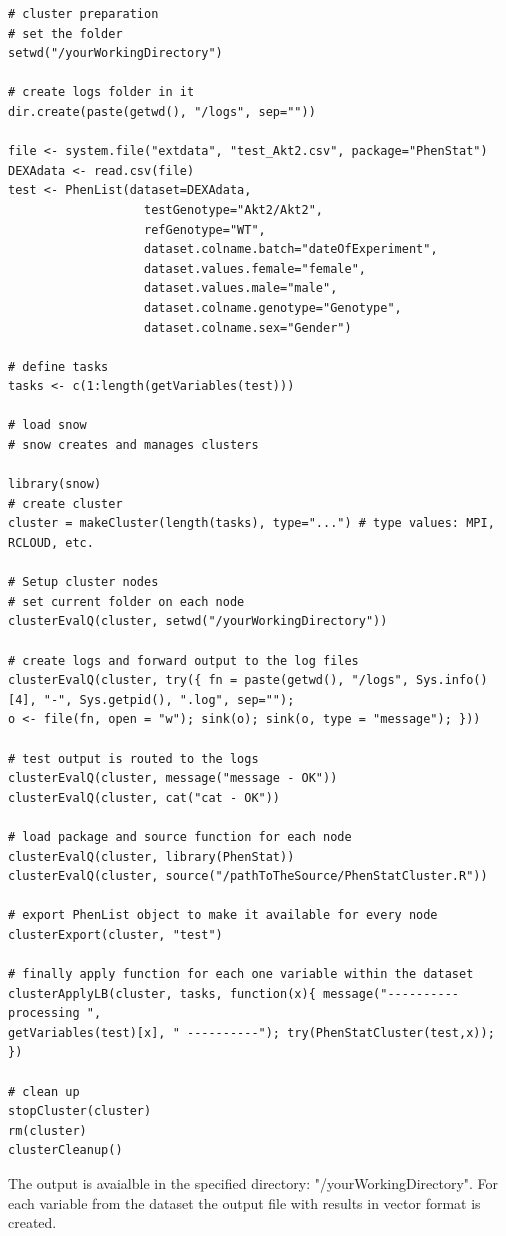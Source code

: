 \documentclass[12pt,a4paper]{article}
\begin{document}
\begingroup
\fontsize{8pt}{12pt}\selectfont
\begin{verbatim}
# cluster preparation
# set the folder
setwd("/yourWorkingDirectory")

# create logs folder in it
dir.create(paste(getwd(), "/logs", sep=""))

file <- system.file("extdata", "test_Akt2.csv", package="PhenStat") 
DEXAdata <- read.csv(file)
test <- PhenList(dataset=DEXAdata,
                   testGenotype="Akt2/Akt2",
                   refGenotype="WT",
                   dataset.colname.batch="dateOfExperiment",
                   dataset.values.female="female",
                   dataset.values.male="male", 
                   dataset.colname.genotype="Genotype", 
                   dataset.colname.sex="Gender")
                   
# define tasks
tasks <- c(1:length(getVariables(test)))

# load snow
# snow creates and manages clusters

library(snow)
# create cluster
cluster = makeCluster(length(tasks), type="...") # type values: MPI, RCLOUD, etc.

# Setup cluster nodes
# set current folder on each node
clusterEvalQ(cluster, setwd("/yourWorkingDirectory"))

# create logs and forward output to the log files
clusterEvalQ(cluster, try({ fn = paste(getwd(), "/logs", Sys.info()[4], "-", Sys.getpid(), ".log", sep=""); 
o <- file(fn, open = "w"); sink(o); sink(o, type = "message"); }))

# test output is routed to the logs
clusterEvalQ(cluster, message("message - OK"))
clusterEvalQ(cluster, cat("cat - OK"))

# load package and source function for each node
clusterEvalQ(cluster, library(PhenStat))
clusterEvalQ(cluster, source("/pathToTheSource/PhenStatCluster.R"))

# export PhenList object to make it available for every node
clusterExport(cluster, "test") 

# finally apply function for each one variable within the dataset
clusterApplyLB(cluster, tasks, function(x){ message("---------- processing ", 
getVariables(test)[x], " ----------"); try(PhenStatCluster(test,x)); })

# clean up
stopCluster(cluster)
rm(cluster)
clusterCleanup()
\end{verbatim}
\endgroup

The output is avaialble in the specified directory: 
"/yourWorkingDirectory". 
For each variable from the dataset the output file with results in vector format is created.
\end{document}

